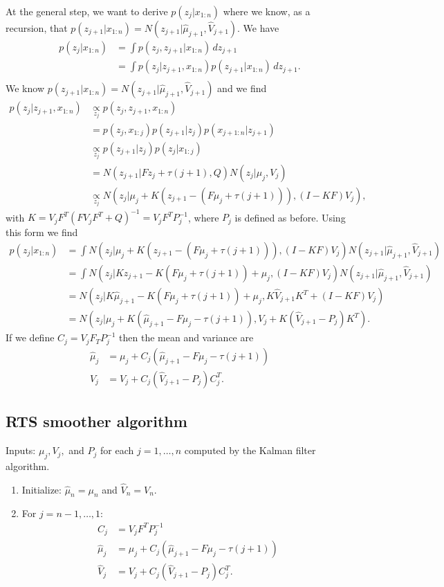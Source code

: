 \documentclass[11pt]{amsart}
\begin{document}
At the general step, we want to derive $p(z_{j}|x_{1:n})$ where we know, as a recursion, that $p(z_{j+1}|x_{1:n}) = N(z_{j+1}|\hat{\mu}_{j+1}, \hat{V}_{j+1})$.  We have
\begin{align*}
p(z_j|x_{1:n}) &= \int p(z_j, z_{j+1}| x_{1:n}) \, dz_{j+1} \\
&= \int p(z_j | z_{j+1}, x_{1:n})p(z_{j+1}|x_{1:n}) \, dz_{j+1}. \\
\end{align*}
We know $p(z_{j+1}|x_{1:n}) = N(z_{j+1}|\hat{\mu}_{j+1}, \hat{V}_{j+1})$ and we find
\begin{align*}
p(z_j | z_{j+1}, x_{1:n}) &\underset{z_j}{\propto} p(z_j, z_{j+1}, x_{1:n}) \\
&= p(z_j, x_{1:j})p(z_{j+1}|z_j)p(x_{j+1:n}|z_{j+1}) \\
&\underset{z_j}{\propto} p(z_{j+1}|z_j)p(z_j|x_{1:j}) \\
&= N(z_{j+1}|Fz_j + \tau(j+1),Q)N(z_j|\mu_j, V_j) \\
&\underset{z_j}{\propto} N(z_j | \mu_j + K(z_{j+1} - (F\mu_j + \tau(j+1))), (I - KF)V_j),
\end{align*}
with $K = V_jF^T(FV_jF^T + Q)^{-1} = V_jF^TP_j^{-1}$, where $P_j$ is defined as before.  Using this form we find
\begin{align*}
p(z_j | x_{1:n}) &= \int N(z_j | \mu_j + K(z_{j+1} - (F\mu_j + \tau(j+1))), (I - KF)V_j)N(z_{j+1}|\hat{\mu}_{j+1}, \hat{V}_{j+1}) \\
&= \int N(z_j | Kz_{j+1} - K(F\mu_j + \tau(j+1)) + \mu_j, (I - KF)V_j)N(z_{j+1}|\hat{\mu}_{j+1}, \hat{V}_{j+1}) \\
&= N(z_j | K\hat{\mu}_{j+1} - K(F\mu_j + \tau(j+1)) + \mu_j, K\hat{V}_{j+1}K^T + (I - KF)V_j) \\
&= N(z_j | \mu_j + K(\hat{\mu}_{j+1} - F\mu_j - \tau(j+1)), V_j + K(\hat{V}_{j+1} - P_j)K^T).
\end{align*}
If we define $C_j = V_jF_TP_j^{-1}$ then the mean and variance are
\begin{align*}
\hat{\mu}_j &= \mu_j + C_j(\hat{\mu}_{j+1} - F\mu_j - \tau(j+1)) \\
\hat{V}_j &= V_j + C_j(\hat{V}_{j+1} - P_j)C_j^T.
\end{align*}


\subsection{RTS smoother algorithm}
Inputs:  $\mu_j, V_j,$ and $P_j$ for each $j= 1,\ldots,n$ computed by the Kalman filter algorithm.  
\begin{enumerate}
\item{Initialize: $\hat{\mu}_n = \mu_n$ and $\hat{V}_n = V_n$.}
\item{For $j = n-1,\ldots, 1:$
\begin{align*}
C_j &= V_jF^TP_j^{-1} \\
\hat{\mu}_j &= \mu_j + C_j(\hat{\mu}_{j+1} - F\mu_j - \tau(j+1)) \\
\hat{V}_j &= V_j + C_j(\hat{V}_{j+1} - P_j)C_j^T.
\end{align*}}
\end{enumerate}
\end{document}
